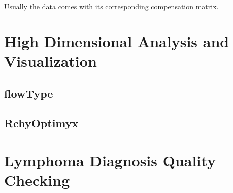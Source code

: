 Usually the data comes with its corresponding compensation matrix. 

\section{High Dimensional Analysis and Visualization}
\subsection{flowType}

\subsection{RchyOptimyx}

\section{Lymphoma Diagnosis Quality Checking}
